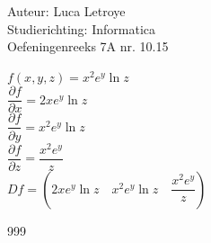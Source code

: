 \documentclass[a4paper]{article}
\begin{document}
  
\noindent \large Auteur: Luca Letroye \\
\noindent \large Studierichting: Informatica\\
\noindent \large Oefeningenreeks 7A nr. 10.15\\

\medskip
\normalsize

$f(x,y,z) = x^2e^y\ln z$\\

$\dfrac{\partial f}{\partial x} = 2xe^y\ln z$\\

$\dfrac{\partial f}{\partial y} = x^2e^y\ln z$\\

$\dfrac{\partial f}{\partial z} = \dfrac{x^2e^y}{z}$\\

$Df = \left(2xe^y\ln z \quad x^2e^y\ln z \quad \dfrac{x^2e^y}{z}\right)$\\






\begin{thebibliography}{999}
\end{thebibliography}
\end{document}

